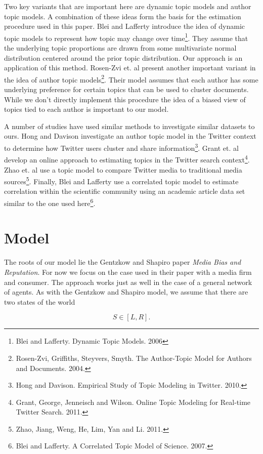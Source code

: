 \documentclass[a4paper]{article}
\begin{document}
Two key variants that are important here are dynamic topic models and author topic models.  A combination of these ideas form the basis for the estimation procedure used in this paper.  Blei
and Lafferty introduce the idea of dynamic topic models to represent how topic may change over time\footnote{Blei and Lafferty.  Dynamic Topic Models. 2006}.  They assume that the underlying topic proportions are drawn from some multivariate normal distribution centered around the prior topic distribution.  Our approach is an application of this method.  Rosen-Zvi et. al present another important variant in the idea of author topic models\footnote{Rosen-Zvi, Griffiths, Steyvers, Smyth.  The Author-Topic Model for Authors and Documents. 2004.}.  Their model assumes that each author has some underlying preference for certain topics that can be used to cluster documents.  While we don't directly implement this procedure the idea of a biased view of topics tied to each author is important to our model.

A number of studies have used similar methods to investigate similar datasets to ours.  Hong and Davison investigate an author topic model in the Twitter context to determine how Twitter users cluster and share information\footnote{Hong and Davison. Empirical Study of Topic Modeling in Twitter. 2010.}.  Grant et. al develop an online approach to estimating topics in the Twitter search context\footnote{Grant, George, Jenneisch and Wilson. Online Topic Modeling for Real-time Twitter Search. 2011.}.  Zhao et. al use a topic model to compare Twitter media to traditional media sources\footnote{Zhao, Jiang, Weng, He, Lim, Yan and Li. 2011.}.  Finally, Blei and Lafferty use a correlated topic model to estimate correlation within the scientific community using an academic article data set similar to the one used here\footnote{Blei and Lafferty. A Correlated Topic Model of Science. 2007.}.

\section{Model}

The roots of our model lie the Gentzkow and Shapiro paper \emph{Media Bias and Reputation}.  For now we focus on the case used in their paper with a media firm and consumer.  The approach works just as well in the case of a general network of agents.  As with the Gentzkow and Shapiro model, we assume that there are two states of the world

\[S \in [L,R].\]
\end{document}
